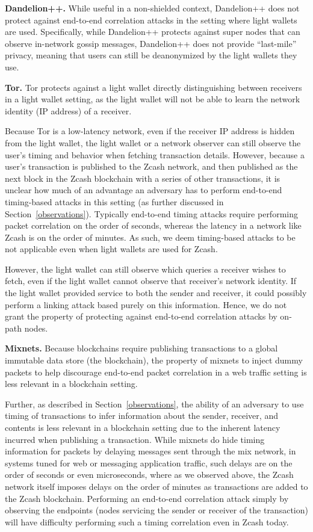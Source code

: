 \documentclass{article}
\begin{document}
\textbf{Dandelion++.}
While useful in a non-shielded context, Dandelion++ does not protect against
end-to-end correlation attacks in the setting where light wallets are used.
Specifically, while Dandelion++ protects against super nodes that can observe
in-network gossip messages, Dandelion++ does not provide ``last-mile'' privacy,
meaning that users can still be deanonymized by the light wallets they use.

\textbf{Tor.}
Tor protects against a light wallet directly distinguishing between receivers
in a light wallet setting, as the light wallet will not be able to learn the
network identity (IP address) of a receiver.

Because Tor is a low-latency
network, even if the receiver IP address is hidden from the light wallet, the
light wallet or a network observer can still observe the user's timing and
behavior when fetching transaction details. However, because a user's
transaction is published to the Zcash network, and then published as the next
block in the Zcash blockchain with a series of other transactions, it is
unclear how much of an advantage an adversary has to perform end-to-end
timing-based attacks in this setting (as further discussed in
Section~\ref{observations}). Typically end-to-end timing attacks
require performing packet correlation on the order of seconds, whereas the
latency in a network like Zcash is on the order of minutes. As such, we deem
timing-based attacks to be not applicable even when light wallets are used for
Zcash.

However, the light wallet can still observe which queries a receiver wishes to
fetch, even if the light wallet cannot observe that receiver's network
identity. If the light wallet provided service to both the sender and receiver,
it could possibly perform a linking attack based purely on this information.
Hence, we do not grant the property of protecting against end-to-end
correlation attacks by on-path nodes.

\textbf{Mixnets.}
Because blockchains require publishing transactions to a global immutable data
store (the blockchain), the property of mixnets to inject dummy packets to help
discourage end-to-end packet correlation in a web traffic setting is less
relevant in a blockchain setting.

Further, as described in Section~\ref{observations}, the ability of an adversary to use timing of
transactions to infer information about the sender, receiver, and
contents is less relevant in a blockchain setting due to the inherent latency
incurred when publishing a transaction.
While mixnets do hide timing information for packets by
delaying messages sent through the mix network, in systems tuned for web or
messaging application traffic, such
delays are on the order of seconds or even microseconds, where as we observed
above, the Zcash network itself imposes delays on the order of minutes as
transactions are added to the Zcash blockchain. Performing an end-to-end
correlation attack simply by observing the endpoints (nodes servicing the
sender or receiver of the transaction) will have difficulty performing such a
timing correlation even in Zcash today.
\end{document}
